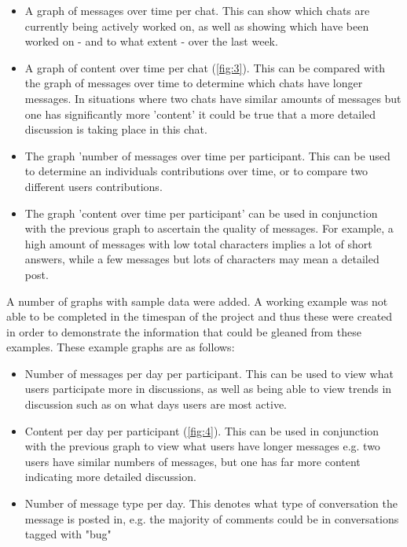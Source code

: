 \documentclass{l4proj}
\begin{document}
\begin{itemize}
\item A graph of messages over time per chat.  This can show which chats are currently being actively worked on, as well as showing which have been worked on - and to what extent - over the last week.
\item A graph of content over time per chat (\ref{fig:3}).  This can be compared with the graph of messages over time to determine which chats have longer messages.  In situations where two chats have similar amounts of messages but one has significantly more 'content' it could be true that a more detailed discussion is taking place in this chat.
\item The graph 'number of messages over time per participant.  This can be used to determine an individuals contributions over time, or to compare two different users contributions.
\item The graph 'content over time per participant' can be used in conjunction with the previous graph to ascertain the quality of messages.  For example, a high amount of messages with low total characters implies a lot of short answers, while a few messages but lots of characters may mean a detailed post.
\end{itemize}



\newpage


A number of graphs with sample data were added.  A working example was not able to be completed in the timespan of the project and thus these were created in order to demonstrate the information that could be gleaned from these examples.  These example graphs are as follows:

\begin{itemize}
\item Number of messages per day per participant.  This can be used to view what users participate more in discussions, as well as being able to view trends in discussion such as on what days users are most active.
\item Content per day per participant (\ref{fig:4}).  This can be used in conjunction with the previous graph to view what users have longer messages e.g. two users have similar numbers of messages, but one has far more content indicating more detailed discussion.
\item Number of message type per day.  This denotes what type of conversation the message is posted in, e.g. the majority of comments could be in conversations tagged with "bug"
\end{itemize}
\end{document}
